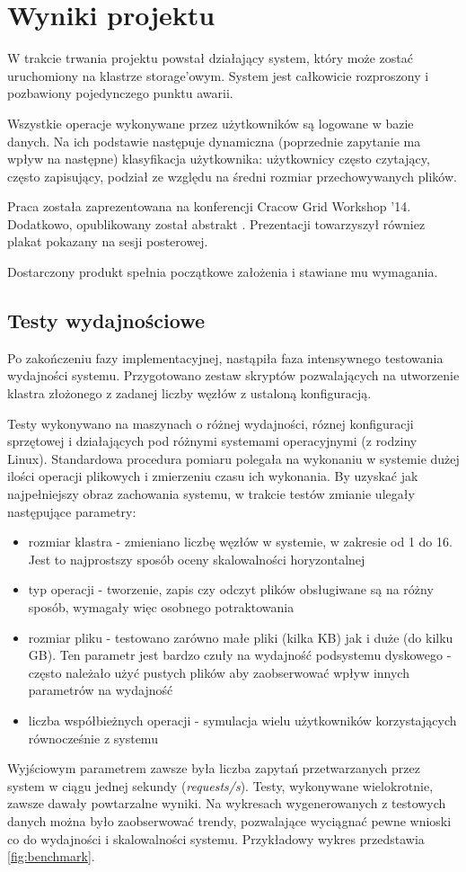 \section{Wyniki projektu}
\label{sec:wyniki-projektu}
W trakcie trwania projektu powstał działający system, który może zostać uruchomiony na klastrze storage'owym. System jest całkowicie rozproszony i pozbawiony pojedynczego punktu awarii.

Wszystkie operacje wykonywane przez użytkowników są logowane w bazie danych. Na ich podstawie następuje dynamiczna (poprzednie zapytanie ma wpływ na następne) klasyfikacja użytkownika: użytkownicy często czytający, często zapisujący, podział ze względu na średni rozmiar przechowywanych plików.

Praca została zaprezentowana na konferencji Cracow Grid Workshop '14. Dodatkowo, opublikowany został abstrakt \textit{} \cite{cgw14}. Prezentacji towarzyszył równiez plakat	 pokazany na sesji posterowej.

Dostarczony produkt spełnia początkowe założenia i stawiane mu wymagania.

\subsection{Testy wydajnościowe}

Po zakończeniu fazy implementacyjnej, nastąpiła faza intensywnego testowania wydajności systemu. Przygotowano zestaw skryptów pozwalających na utworzenie klastra złożonego z zadanej liczby węzłów z ustaloną konfiguracją.

Testy wykonywano na maszynach o różnej wydajności, róznej konfiguracji sprzętowej i działających pod różnymi systemami operacyjnymi (z rodziny Linux). Standardowa procedura pomiaru polegała na wykonaniu w systemie dużej ilości operacji plikowych i zmierzeniu czasu ich wykonania. By uzyskać jak najpełniejszy obraz zachowania systemu, w trakcie testów zmianie ulegały następujące parametry:
\begin{itemize}
	\item rozmiar klastra - zmieniano liczbę węzłów w systemie, w zakresie od 1 do 16. Jest to najprostszy sposób oceny skalowalności horyzontalnej
	\item typ operacji - tworzenie, zapis czy odczyt plików obsługiwane są na różny sposób, wymagały więc osobnego potraktowania
	\item rozmiar pliku - testowano zarówno małe pliki (kilka KB) jak i duże (do kilku GB). Ten parametr jest bardzo czuły na wydajność podsystemu dyskowego - często należało użyć pustych plików aby zaobserwować wpływ innych parametrów na wydajność
	\item liczba współbieżnych operacji - symulacja wielu użytkowników korzystających równocześnie z systemu
\end{itemize}
Wyjściowym parametrem zawsze była liczba zapytań przetwarzanych przez system w ciągu jednej sekundy (\textit{requests/s}). Testy, wykonywane wielokrotnie, zawsze dawały powtarzalne wyniki. Na wykresach wygenerowanych z testowych danych można było zaobserwować trendy, pozwalające wyciągnać pewne wnioski co do wydajności i skalowalności systemu. Przykładowy wykres przedstawia \autoref{fig:benchmark}.

